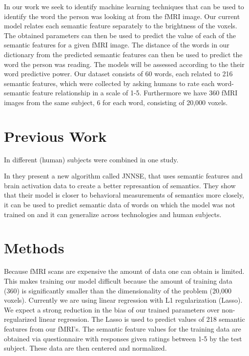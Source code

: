 \documentclass{article} %
\begin{document}
In our work we seek to identify machine learning techniques that can be used to identify the word the person was looking at from the fMRI image. Our current model relates each semantic feature separately to the brightness of the voxels. The obtained parameters can then be used to predict the value of each of the semantic features for a given fMRI image. The distance of the words in our dictionary from the predicted semantic features can then be used to predict the word the person was reading. The models will be assessed according to the their word predictive power. Our dataset consists of 60 words, each related to 216 semantic features, which were collected by asking humans to rate each word-semantic feature relationship in a scale of 1-5. Furthermore we have 360 fMRI images from the same subject, 6 for each word, consisting of 20,000 voxels. 



\section{Previous Work}



In \cite{mahtiyarThesis} different (human) subjects were combined in one study.


In \cite{fyshe2014interpretable} they present a new algorithm called JNNSE, that uses semantic features and brain activation data to create a better represantion of semantics. They show that their model is closer to behavioral measurements of semantics more closely, it can be used to predict semantic data of words on which the model was not trained on and it can generalize across technologies and human subjects.  


\section{Methods}
Because fMRI scans are expensive the amount of data one can obtain is limited. This makes training our model difficult because the amount of training data (360) is significantly smaller than the dimensionality of the problem (20,000 voxels). Currently we are using linear regression with L1 regularization (Lasso). We expect a strong reduction in the bias of our trained parameters over non-regularized linear regression. The Lasso is used to predict values of 218 semantic features from our fMRI's. The semantic feature values for the training data are obtained via questionnaire with responses given ratings between 1-5 by the test subject. These data are then centered and normalized.
\end{document}
